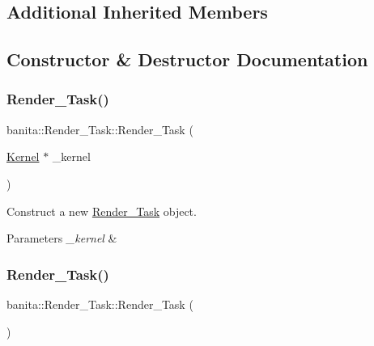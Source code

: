 \subsection*{Additional Inherited Members}


\subsection{Constructor \& Destructor Documentation}
\mbox{\label{classbanita_1_1_render___task_a1b8ba204040888c1b9487cd2d08e2e3d}} 
\subsubsection{\texorpdfstring{Render\_Task()}{Render\_Task()}\hspace{0.1cm}{\footnotesize\ttfamily [1/2]}}
{\footnotesize\ttfamily banita\+::\+Render\+\_\+\+Task\+::\+Render\+\_\+\+Task (\begin{DoxyParamCaption}\item[{\mbox{\hyperlink{classbanita_1_1_kernel}{Kernel}} $\ast$}]{\+\_\+kernel }\end{DoxyParamCaption})}



Construct a new \mbox{\hyperlink{classbanita_1_1_render___task}{Render\+\_\+\+Task}} object. 


\begin{DoxyParams}{Parameters}
{\em \+\_\+kernel} & \\
\hline
\end{DoxyParams}
\mbox{\label{classbanita_1_1_render___task_a556e9242d3cf844f11790daa616e6036}} 
\subsubsection{\texorpdfstring{Render\_Task()}{Render\_Task()}\hspace{0.1cm}{\footnotesize\ttfamily [2/2]}}
{\footnotesize\ttfamily banita\+::\+Render\+\_\+\+Task\+::\+Render\+\_\+\+Task (\begin{DoxyParamCaption}{ }\end{DoxyParamCaption})}



